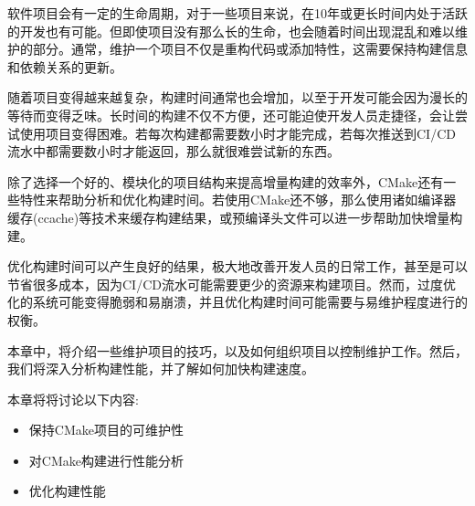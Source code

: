 软件项目会有一定的生命周期，对于一些项目来说，在10年或更长时间内处于活跃的开发也有可能。但即使项目没有那么长的生命，也会随着时间出现混乱和难以维护的部分。通常，维护一个项目不仅是重构代码或添加特性，这需要保持构建信息和依赖关系的更新。

随着项目变得越来越复杂，构建时间通常也会增加，以至于开发可能会因为漫长的等待而变得乏味。长时间的构建不仅不方便，还可能迫使开发人员走捷径，会让尝试使用项目变得困难。若每次构建都需要数小时才能完成，若每次推送到CI/CD流水中都需要数小时才能返回，那么就很难尝试新的东西。

除了选择一个好的、模块化的项目结构来提高增量构建的效率外，CMake还有一些特性来帮助分析和优化构建时间。若使用CMake还不够，那么使用诸如编译器缓存(ccache)等技术来缓存构建结果，或预编译头文件可以进一步帮助加快增量构建。

优化构建时间可以产生良好的结果，极大地改善开发人员的日常工作，甚至是可以节省很多成本，因为CI/CD流水可能需要更少的资源来构建项目。然而，过度优化的系统可能变得脆弱和易崩溃，并且优化构建时间可能需要与易维护程度进行的权衡。

本章中，将介绍一些维护项目的技巧，以及如何组织项目以控制维护工作。然后，我们将深入分析构建性能，并了解如何加快构建速度。

本章将将讨论以下内容:

\begin{itemize}
\item 
保持CMake项目的可维护性

\item 
对CMake构建进行性能分析

\item 
优化构建性能
\end{itemize}
